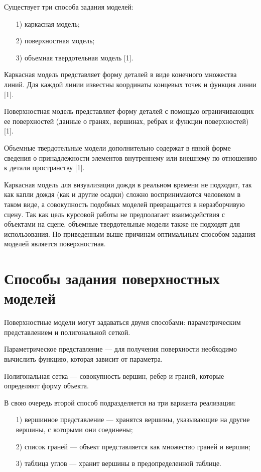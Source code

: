 Существует три способа задания моделей:

\begin{enumerate}
\item[1)]
каркасная модель;
\item[2)]
поверхностная модель;
\item[3)]
объемная твердотельная модель [1].
\end{enumerate}

Каркасная модель представляет форму деталей в виде конечного множества линий. Для каждой линии известны координаты концевых точек и функция линии [1].

Поверхностная модель представляет форму деталей с помощью ограничивающих ее поверхностей (данные о гранях, вершинах, ребрах и функции поверхностей) [1].

Объемные твердотельные модели дополнительно содержат в явной форме сведения о принадлежности элементов внутреннему или внешнему по отношению к детали пространству [1].

Каркасная модель для визуализации дождя в реальном времени не подходит, так как капли дождя (как и другие осадки) сложно воспринимаются человеком в таком виде, а совокупность подобных моделей превращается в неразборчивую сцену. 
Так как цель курсовой работы не предполагает взаимодействия с объектами на сцене, объемные твердотельные модели также не подходят для использования. 
По приведенным выше причинам оптимальным способом задания моделей является поверхностная.

\section{Способы задания поверхностных моделей}

Поверхностные модели могут задаваться двумя способами: параметрическим представлением и полигональной сеткой.

Параметрическое представление --- для получения поверхности необходимо вычислить функцию, которая зависит от параметра.

Полигональная сетка --- совокупность вершин, ребер и граней, которые определяют форму объекта.

В свою очередь второй способ подразделяется на три варианта реализации:

\begin{enumerate}
\item[1)]
вершинное представление --- хранятся вершины, указывающие на другие вершины, с которыми они соединены;
\item[2)]
список граней --- объект представляется как множество граней и вершин;
\item[3)]
таблица углов --- хранит вершины в предопределенной таблице.
\end{enumerate}

